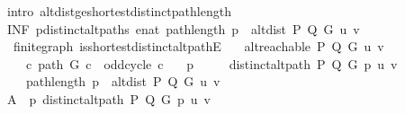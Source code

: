 \begin{isabellebody}
\ {\isacharparenleft}{\kern0pt}intro\ alt{\isacharunderscore}{\kern0pt}dist{\isacharunderscore}{\kern0pt}ge{\isacharunderscore}{\kern0pt}shortest{\isacharunderscore}{\kern0pt}distinct{\isacharunderscore}{\kern0pt}path{\isacharunderscore}{\kern0pt}length{\isacharparenright}{\kern0pt}\isanewline
\ \ \isamarkupfalse%
\ \isamarkupfalse%
\ {\isachardoublequoteopen}{\isacharparenleft}{\kern0pt}INF\ p{\isasymin}{\isacharquery}{\kern0pt}distinct{\isacharunderscore}{\kern0pt}alt{\isacharunderscore}{\kern0pt}paths{\isachardot}{\kern0pt}\ enat\ {\isacharparenleft}{\kern0pt}path{\isacharunderscore}{\kern0pt}length\ p{\isacharparenright}{\kern0pt}{\isacharparenright}{\kern0pt}\ {\isasymle}\ alt{\isacharunderscore}{\kern0pt}dist\ P\ Q\ G\ u\ v{\isachardoublequoteclose}\isanewline
\ \ \ \ \isacommand{{\isachardot}{\kern0pt}}\isamarkupfalse%
\isanewline
{}\isamarkupfalse%
%
\endisatagproof
{\isafoldproof}%
%
\isadelimproof
\isanewline
%
\endisadelimproof
%
\isadeliminvisible
\isanewline
%
\endisadeliminvisible
%
\isataginvisible
{}\isamarkupfalse%
\ {\isacharparenleft}{\kern0pt}\ finite{\isacharunderscore}{\kern0pt}graph{\isacharparenright}{\kern0pt}\ is{\isacharunderscore}{\kern0pt}shortest{\isacharunderscore}{\kern0pt}distinct{\isacharunderscore}{\kern0pt}alt{\isacharunderscore}{\kern0pt}pathE{\isacharcolon}{\kern0pt}\isanewline
\ \ \ {\isachardoublequoteopen}alt{\isacharunderscore}{\kern0pt}reachable\ P\ Q\ G\ u\ v{\isachardoublequoteclose}\isanewline
\ \ \ {\isachardoublequoteopen}{\isasymnot}\ {\isacharparenleft}{\kern0pt}{\isasymexists}c{\isachardot}{\kern0pt}\ path\ G\ c\ {\isasymand}\ odd{\isacharunderscore}{\kern0pt}cycle\ c{\isacharparenright}{\kern0pt}{\isachardoublequoteclose}\isanewline
\ \ \ p\ \isanewline
\ \ \ \ {\isachardoublequoteopen}distinct{\isacharunderscore}{\kern0pt}alt{\isacharunderscore}{\kern0pt}path\ P\ Q\ G\ p\ u\ v{\isachardoublequoteclose}\isanewline
\ \ \ \ {\isachardoublequoteopen}path{\isacharunderscore}{\kern0pt}length\ p\ {\isacharequal}{\kern0pt}\ alt{\isacharunderscore}{\kern0pt}dist\ P\ Q\ G\ u\ v{\isachardoublequoteclose}%
\endisataginvisible
{\isafoldinvisible}%
%
\isadeliminvisible
\isanewline
%
\endisadeliminvisible
%
\isadelimproof
%
\endisadelimproof
%
\isatagproof
{}\isamarkupfalse%
\ {\isacharminus}{\kern0pt}\isanewline
\ \ \isamarkupfalse%
\ {\isacharquery}{\kern0pt}A\ {\isacharequal}{\kern0pt}\ {\isachardoublequoteopen}{\isacharbraceleft}{\kern0pt}p{\isachardot}{\kern0pt}\ distinct{\isacharunderscore}{\kern0pt}alt{\isacharunderscore}{\kern0pt}path\ P\ Q\ G\ p\ u\ v{\isacharbraceright}{\kern0pt}{\isachardoublequoteclose}\isanewline

\end{isabellebody}

